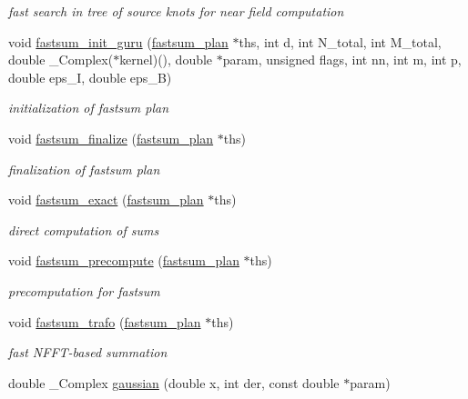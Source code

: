 \begin{CompactItemize}
\begin{CompactList}\small\item\em fast search in tree of source knots for near field computation \item\end{CompactList}\item 
void \hyperlink{group__applications__fastsum_gc9d2c1acc65b11636c1080e1dd9169ad}{fastsum\_\-init\_\-guru} (\hyperlink{structfastsum__plan}{fastsum\_\-plan} $\ast$ths, int d, int N\_\-total, int M\_\-total, double \_\-Complex($\ast$kernel)(), double $\ast$param, unsigned flags, int nn, int m, int p, double eps\_\-I, double eps\_\-B)
\begin{CompactList}\small\item\em initialization of fastsum plan \item\end{CompactList}\item 
void \hyperlink{group__applications__fastsum_gb989ea4659fe681bd4c025e82756f769}{fastsum\_\-finalize} (\hyperlink{structfastsum__plan}{fastsum\_\-plan} $\ast$ths)
\begin{CompactList}\small\item\em finalization of fastsum plan \item\end{CompactList}\item 
void \hyperlink{group__applications__fastsum_gaee3dd954ffc99e4330fabe16ccad0fd}{fastsum\_\-exact} (\hyperlink{structfastsum__plan}{fastsum\_\-plan} $\ast$ths)
\begin{CompactList}\small\item\em direct computation of sums \item\end{CompactList}\item 
void \hyperlink{group__applications__fastsum_g197c16fcec7935886fc97d140f2b20ff}{fastsum\_\-precompute} (\hyperlink{structfastsum__plan}{fastsum\_\-plan} $\ast$ths)
\begin{CompactList}\small\item\em precomputation for fastsum \item\end{CompactList}\item 
void \hyperlink{group__applications__fastsum_gab2cc691ba59064c18d439c9fd2185e8}{fastsum\_\-trafo} (\hyperlink{structfastsum__plan}{fastsum\_\-plan} $\ast$ths)
\begin{CompactList}\small\item\em fast NFFT-based summation \item\end{CompactList}\item 
\hypertarget{group__applications__fastsum_g81bf029788afe857325a760743f9fdd3}{
double \_\-Complex \hyperlink{group__applications__fastsum_g81bf029788afe857325a760743f9fdd3}{gaussian} (double x, int der, const double $\ast$param)}
\label{group__applications__fastsum_g81bf029788afe857325a760743f9fdd3}


\end{CompactItemize}
